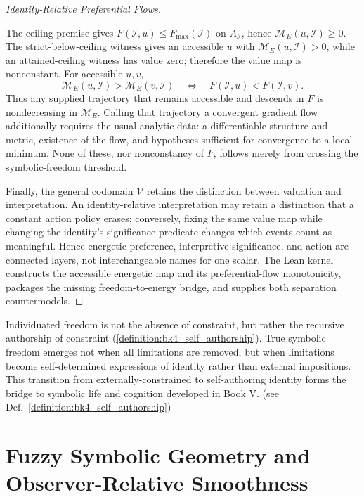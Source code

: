 \begin{proof}[Identity-Relative Preferential Flows]
\label{proof:bk4_sketch_preferential_flows}
\leavevmode

The ceiling premise gives
$F(\mathcal I,u)\leq F_{\max}(\mathcal I)$ on $A_{\mathcal I}$, hence
$\mathcal M_E(u,\mathcal I)\geq0$.  The strict-below-ceiling witness gives an
accessible $u$ with $\mathcal M_E(u,\mathcal I)>0$, while an attained-ceiling
witness has value zero; therefore the value map is nonconstant.  For accessible
$u,v$,
\[
 \mathcal M_E(u,\mathcal I)>\mathcal M_E(v,\mathcal I)
 \quad\Longleftrightarrow\quad
 F(\mathcal I,u)<F(\mathcal I,v).
\]
Thus any supplied trajectory that remains accessible and descends in $F$ is
nondecreasing in $\mathcal M_E$.  Calling that trajectory a convergent gradient
flow additionally requires the usual analytic data: a differentiable structure
and metric, existence of the flow, and hypotheses sufficient for convergence
to a local minimum.  None of these, nor nonconstancy of $F$, follows merely
from crossing the symbolic-freedom threshold.

Finally, the general codomain $\mathcal V$ retains the distinction between
valuation and interpretation.  An identity-relative interpretation may retain
a distinction that a constant action policy erases; conversely, fixing the
same value map while changing the identity's significance predicate changes
which events count as meaningful.  Hence energetic preference, interpretive
significance, and action are connected layers, not interchangeable names for
one scalar.  The Lean kernel constructs the accessible energetic map and its
preferential-flow monotonicity, packages the missing freedom-to-energy bridge,
and supplies both separation countermodels.
\end{proof}
\begin{remark}
\label{remark:bk4_individuated_freedom}
Individuated freedom is not the absence of constraint, but rather the recursive authorship of constraint (\ref{definition:bk4_self_authorship}). True symbolic freedom emerges not when all limitations are removed, but when limitations become self-determined expressions of identity rather than external impositions. This transition from externally-constrained to self-authoring identity forms the bridge to symbolic life and cognition developed in Book V. (see Def.~\ref{definition:bk4_self_authorship})
\end{remark}
\section{Fuzzy Symbolic Geometry and Observer-Relative Smoothness}
\label{sec:bk4_fuzzy_symbolic_geometry_observer_relative_smoothness}
